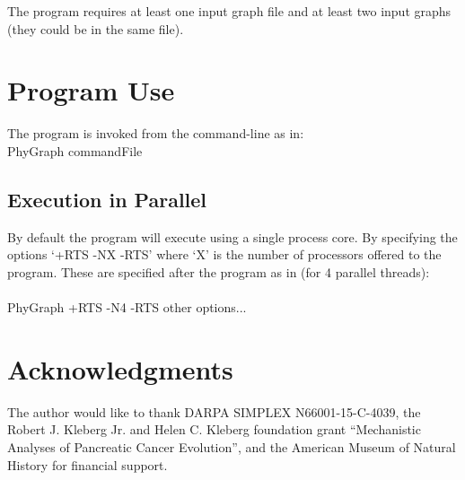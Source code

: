 \documentclass[11pt]{memoir}
\begin{document}
	The program requires at least one input graph file and at least two input graphs (they could be in the same file).

	
	\section{Program Use}
	The program is invoked from the command-line as in:\\
	PhyGraph commandFile\\
	
	
	\subsection{Execution in Parallel}
	By default the program will execute using a single process core.  By specifying the options `+RTS -NX -RTS' where `X' is the number of processors offered to the program. These are specified after the program as in (for 4 parallel threads):\\
	\\
	PhyGraph +RTS -N4 -RTS other options...  \\
	
	\section*{Acknowledgments}
	The author would like to thank DARPA SIMPLEX N66001-15-C-4039, the  Robert J. Kleberg Jr. and Helen C. Kleberg foundation grant ``Mechanistic Analyses of Pancreatic Cancer Evolution'', and the American Museum of Natural History for financial support.  
	
	
\end{document}
